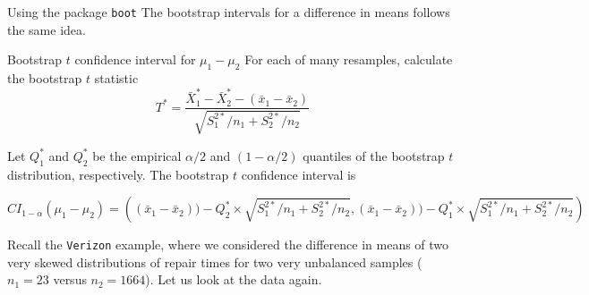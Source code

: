 \documentclass[
  ignorenonframetext,
]{beamer}
\begin{document}
\begin{frame}[fragile]{Using the package \texttt{boot}}
The bootstrap intervals for a difference in means follows the same idea.
\end{frame}

\begin{frame}[fragile]{Bootstrap \(t\) confidence interval for
\(\mu_1-\mu_2\)}
\protect\hypertarget{bootstrap-t-confidence-interval-for-mu_1-mu_2}{}
For each of many resamples, calculate the bootstrap \(t\) statistic
\[T^*=\frac{\bar{X}^*_1-\bar{X}^*_2-(\bar{x}_1-\bar{x}_2)}{\sqrt{S^{2*}_1/n_1+S^{2*}_2/n_2}}\]

Let \(Q_1^*\) and \(Q_2^*\) be the empirical \(\alpha/2\) and
\((1-\alpha/2)\) quantiles of the bootstrap \(t\) distribution,
respectively. The bootstrap \(t\) confidence interval is

\[\scriptstyle CI_{1-\alpha}(\mu_1-\mu_2)=\left((\bar{x}_1-\bar{x}_2))-Q_2^*\times\sqrt{S^{2*}_1/n_1+S^{2*}_2/n_2},(\bar{x}_1-\bar{x}_2))-Q_1^*\times\sqrt{S^{2*}_1/n_1+S^{2*}_2/n_2}\right)\]

Recall the \texttt{Verizon} example, where we considered the difference
in means of two very skewed distributions of repair times for two very
unbalanced samples (\(n_1=23\) versus \(n_2=1664\)). Let us look at the
data again.
\end{frame}
\end{document}
